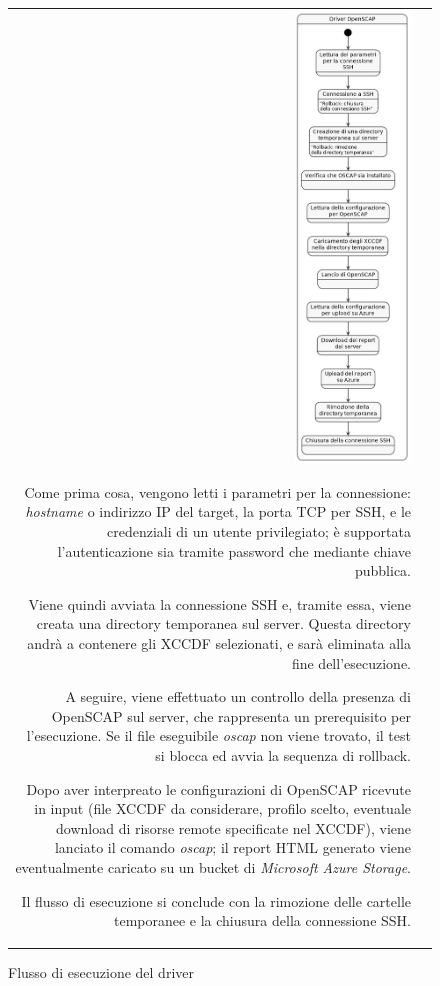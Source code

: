 \documentclass[../main.tex]{subfiles}
\begin{document}
\begin{figure}[H]
\begin{tabular}{rl} 
\begin{minipage}{0.4\textwidth} 
\centering
\includegraphics[height=12cm]{immagini/DRIVER_OPENSCAP.png}

\end{minipage} 

\begin{minipage}{0.54\textwidth} 
Come prima cosa, vengono  letti i parametri per la connessione: \textit{hostname} o indirizzo IP del target, la porta TCP per SSH, e le credenziali di un utente privilegiato; è supportata l'autenticazione sia tramite password che mediante chiave pubblica.

Viene quindi avviata la connessione SSH e, tramite essa, viene creata una directory temporanea sul server. Questa directory andrà a contenere gli XCCDF selezionati, e sarà eliminata alla fine dell'esecuzione.

A seguire, viene effettuato un controllo della presenza di OpenSCAP sul server, che rappresenta un prerequisito per l'esecuzione. Se il file eseguibile \textit{oscap} non viene trovato, il test si blocca ed avvia la sequenza di rollback.

Dopo aver interpreato le configurazioni di OpenSCAP ricevute in input (file XCCDF da considerare, profilo scelto, eventuale download di risorse remote specificate nel XCCDF), viene lanciato il comando \textit{oscap}; il report HTML generato viene eventualmente caricato su un bucket di \textit{Microsoft Azure Storage}.

Il flusso di esecuzione si conclude con la rimozione delle cartelle temporanee e la chiusura della connessione SSH.

\end{minipage} 
\end{tabular}

\caption{Flusso di esecuzione del driver}\label{fig:flussodriver1}
\end{figure}
\end{document}
